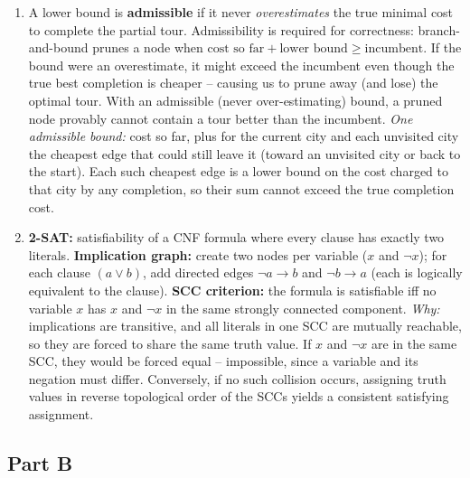 \documentclass[11pt]{article}
\begin{document}
\begin{enumerate}[label=\textbf{A\arabic*.}, leftmargin=2.2em]
\item A lower bound is \textbf{admissible} if it never \emph{overestimates} the
true minimal cost to complete the partial tour. Admissibility is required for
correctness: branch-and-bound prunes a node when $\text{cost so far} +
\text{lower bound} \ge \text{incumbent}$. If the bound were an overestimate, it
might exceed the incumbent even though the true best completion is cheaper --
causing us to prune away (and lose) the optimal tour. With an admissible (never
over-estimating) bound, a pruned node provably cannot contain a tour better than
the incumbent. \emph{One admissible bound:} cost so far, plus for the current
city and each unvisited city the cheapest edge that could still leave it (toward
an unvisited city or back to the start). Each such cheapest edge is a lower
bound on the cost charged to that city by any completion, so their sum cannot
exceed the true completion cost.

\item \textbf{2-SAT:} satisfiability of a CNF formula where every clause has
exactly two literals. \textbf{Implication graph:} create two nodes per variable
($x$ and $\lnot x$); for each clause $(a \lor b)$, add directed edges
$\lnot a \to b$ and $\lnot b \to a$ (each is logically equivalent to the
clause). \textbf{SCC criterion:} the formula is satisfiable iff no variable $x$
has $x$ and $\lnot x$ in the same strongly connected component. \emph{Why:}
implications are transitive, and all literals in one SCC are mutually reachable,
so they are forced to share the same truth value. If $x$ and $\lnot x$ are in
the same SCC, they would be forced equal -- impossible, since a variable and its
negation must differ. Conversely, if no such collision occurs, assigning truth
values in reverse topological order of the SCCs yields a consistent satisfying
assignment.

\end{enumerate}

\subsection*{Part B}
\end{document}
